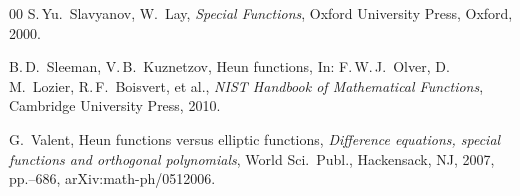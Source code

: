 \documentclass[11pt]{article}
\begin{document}
\begin{thebibliography}{00}
 S.\,Yu.\ Slavyanov, W.\ Lay, \emph{Special Functions},
Oxford University Press, Oxford, 2000.

 B.\,D.\ Sleeman, V.\,B.\ Kuznetzov,  Heun functions,
In: F.\,W.\,J.~Olver, D.\,M.~Lozier, R.\,F.~Boisvert, et al., \emph{NIST
Handbook of Mathematical Functions}, Cambridge University Press, 2010.

 G.\ Valent, Heun functions versus elliptic functions,
\textit{Difference equations, special functions and orthogonal polynomials},
World Sci.\ Publ., Hackensack, NJ, 2007, pp.--686,
arXiv:\mbox{math-ph}/0512006.


\end{thebibliography}
\end{document}
